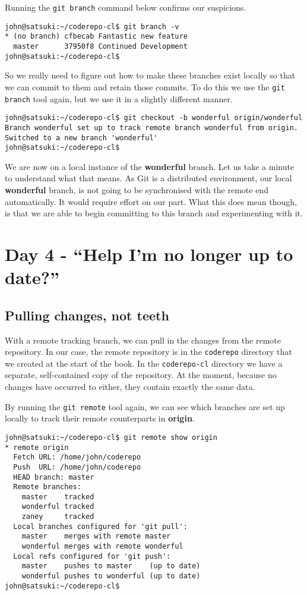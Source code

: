 Running the \texttt{git branch} command below confirms our suspicions.

\begin{Verbatim}
john@satsuki:~/coderepo-cl$ git branch -v
* (no branch) cfbecab Fantastic new feature
  master      37950f8 Continued Development
john@satsuki:~/coderepo-cl$ 
\end{Verbatim}

So we really need to figure out how to make these branches exist locally so that we can commit to them and retain those commits.  To do this we use the \texttt{git branch} tool again, but we use it in a slightly different manner.  

\begin{Verbatim}
john@satsuki:~/coderepo-cl$ git checkout -b wonderful origin/wonderful 
Branch wonderful set up to track remote branch wonderful from origin.
Switched to a new branch 'wonderful'
john@satsuki:~/coderepo-cl$ 
\end{Verbatim}

We are now on a local instance of the \textbf{wonderful} branch.  Let us take a minute to understand what that means.  As Git is a distributed environment, our local \textbf{wonderful} branch, is not going to be synchronised with the remote end automatically.  It would require effort on our part.  What this does mean though, is that we are able to begin committing to this branch and experimenting with it.

\section{Day 4 - ``Help I'm no longer up to date?''}
\subsection{Pulling changes, not teeth}

With a remote tracking branch, we can pull in the changes from the remote repository.  In our case, the remote repository is in the \texttt{coderepo} directory that we created at the start of the book.  In the \texttt{coderepo-cl} directory we have a separate, self-contained copy of the repository.  At the moment, because no changes have occurred to either, they contain exactly the same data.

By running the \texttt{git remote} tool again, we can see which branches are set up locally to track their remote counterparts in \textbf{origin}.

\begin{Verbatim}
john@satsuki:~/coderepo-cl$ git remote show origin
* remote origin
  Fetch URL: /home/john/coderepo
  Push  URL: /home/john/coderepo
  HEAD branch: master
  Remote branches:
    master    tracked
    wonderful tracked
    zaney     tracked
  Local branches configured for 'git pull':
    master    merges with remote master
    wonderful merges with remote wonderful
  Local refs configured for 'git push':
    master    pushes to master    (up to date)
    wonderful pushes to wonderful (up to date)
john@satsuki:~/coderepo-cl$ 
\end{Verbatim}

